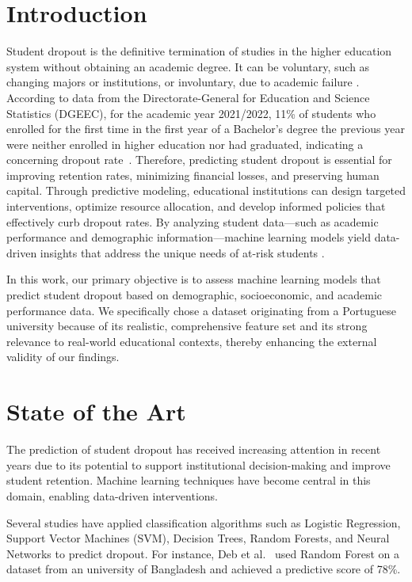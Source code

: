 \documentclass[runningheads]{llncs}
\begin{document}
\section{Introduction}
Student dropout is the definitive termination of studies in the higher education system without obtaining an academic degree. It can be voluntary, such as changing majors or institutions, or involuntary, due to academic failure \cite{Larsen2013Evidence}.
According to data from the Directorate-General for Education and Science Statistics (DGEEC), for the academic year 2021/2022, 11\% of students who enrolled for the first time in the first year of a Bachelor's degree the previous year were neither enrolled in higher education nor had graduated, indicating a concerning dropout rate~\cite{poligrafo2024}.
Therefore, predicting student dropout is essential for improving retention rates, minimizing financial losses, and preserving human capital. Through predictive modeling, educational institutions can design targeted interventions, optimize resource allocation, and develop informed policies that effectively curb dropout rates. By analyzing student data—such as academic performance and demographic information—machine learning models yield data-driven insights that address the unique needs of at-risk students \cite{Vaarma2024Predicting}.

In this work, our primary objective is to assess machine learning models that predict student dropout based on demographic, socioeconomic, and academic performance data. We specifically chose a dataset originating from a Portuguese university because of its realistic, comprehensive feature set and its strong relevance to real-world educational contexts, thereby enhancing the external validity of our findings.

\section{State of the Art}

The prediction of student dropout has received increasing attention in recent years due to its potential to support institutional decision-making and improve student retention. Machine learning techniques have become central in this domain, enabling data-driven interventions.

Several studies have applied classification algorithms such as Logistic Regression, Support Vector Machines (SVM), Decision Trees, Random Forests, and Neural Networks to predict dropout. For instance, Deb et al.~\cite{deb2024dropout} used Random Forest on a dataset from an university of Bangladesh and achieved a predictive score of 78\%. 
\end{document}
